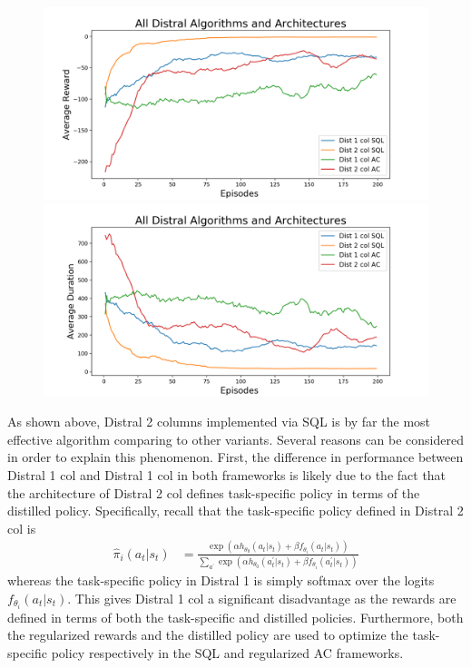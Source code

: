 \documentclass[12pt]{report}
\begin{document}
\begin{figure}[H]
\centering
\begin{minipage}{.5\textwidth}
\centering
\includegraphics[width=\textwidth]{figs/all_algos_rwd.png}
\end{minipage}%
\centering
\begin{minipage}{.5\textwidth}
\centering
\includegraphics[width=\textwidth]{figs/all_algos_dur.png}
\end{minipage}%
\end{figure}

As shown above, Distral 2 columns implemented via SQL is by far the most effective algorithm comparing to other variants. Several reasons can be considered in order to explain this phenomenon. First, the difference in performance between Distral 1 col and Distral 1 col in both frameworks is likely due to the fact that the architecture of Distral 2 col defines task-specific policy in terms of the distilled policy. Specifically, recall that the task-specific policy defined in Distral 2 col is 
\begin{align}
\hat{\pi}_i(a_t|s_t) &= \frac{\exp(\alpha h_{\theta_0}(a_t| s_t) + \beta f_{\theta_i}(a_t | s_t))}{\sum_{a^\prime}\exp(\alpha h_{\theta_0}(a^\prime_t | s_t) + \beta f_{\theta_i}(a^\prime _t | s_t))} \nonumber
\end{align}
whereas the task-specific policy in Distral 1 is simply softmax over the logits $f_{\theta_i}(a_t | s_t)$. This gives Distral 1 col a significant disadvantage as the rewards are defined in terms of both the task-specific and distilled policies. Furthermore, both the regularized rewards and the distilled policy are used to optimize the task-specific policy respectively in the SQL and regularized AC frameworks.
\end{document}
